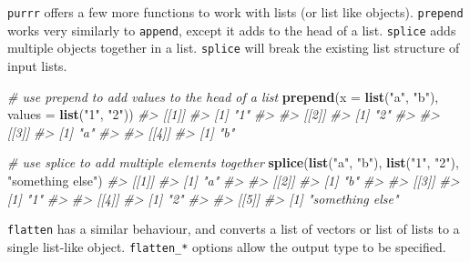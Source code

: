 \documentclass[]{book}
\newenvironment{Shaded}{}{}
\newcommand{\CommentTok}[1]{\textcolor[rgb]{0.38,0.63,0.69}{\textit{#1}}}
\newcommand{\DataTypeTok}[1]{\textcolor[rgb]{0.56,0.13,0.00}{#1}}
\newcommand{\DecValTok}[1]{\textcolor[rgb]{0.25,0.63,0.44}{#1}}
\newcommand{\KeywordTok}[1]{\textcolor[rgb]{0.00,0.44,0.13}{\textbf{#1}}}
\newcommand{\NormalTok}[1]{#1}
\newcommand{\StringTok}[1]{\textcolor[rgb]{0.25,0.44,0.63}{#1}}
\begin{document}
\texttt{purrr} offers a few more functions to work with lists (or list like objects). \texttt{prepend} works very similarly to \texttt{append}, except it adds to the head of a list. \texttt{splice} adds multiple objects together in a list. \texttt{splice} will break the existing list structure of input lists.

\begin{Shaded}
\begin{Highlighting}[]
\CommentTok{# use prepend to add values to the head of a list}
\KeywordTok{prepend}\NormalTok{(}\DataTypeTok{x =} \KeywordTok{list}\NormalTok{(}\StringTok{"a"}\NormalTok{, }\StringTok{"b"}\NormalTok{), }\DataTypeTok{values =} \KeywordTok{list}\NormalTok{(}\StringTok{"1"}\NormalTok{, }\StringTok{"2"}\NormalTok{))}
\CommentTok{#> [[1]]}
\CommentTok{#> [1] "1"}
\CommentTok{#> }
\CommentTok{#> [[2]]}
\CommentTok{#> [1] "2"}
\CommentTok{#> }
\CommentTok{#> [[3]]}
\CommentTok{#> [1] "a"}
\CommentTok{#> }
\CommentTok{#> [[4]]}
\CommentTok{#> [1] "b"}

\CommentTok{# use splice to add multiple elements together}
\KeywordTok{splice}\NormalTok{(}\KeywordTok{list}\NormalTok{(}\StringTok{"a"}\NormalTok{, }\StringTok{"b"}\NormalTok{), }\KeywordTok{list}\NormalTok{(}\StringTok{"1"}\NormalTok{, }\StringTok{"2"}\NormalTok{), }\StringTok{"something else"}\NormalTok{)}
\CommentTok{#> [[1]]}
\CommentTok{#> [1] "a"}
\CommentTok{#> }
\CommentTok{#> [[2]]}
\CommentTok{#> [1] "b"}
\CommentTok{#> }
\CommentTok{#> [[3]]}
\CommentTok{#> [1] "1"}
\CommentTok{#> }
\CommentTok{#> [[4]]}
\CommentTok{#> [1] "2"}
\CommentTok{#> }
\CommentTok{#> [[5]]}
\CommentTok{#> [1] "something else"}
\end{Highlighting}
\end{Shaded}

\texttt{flatten} has a similar behaviour, and converts a list of vectors or list of lists to a single list-like object. \texttt{flatten\_*} options allow the output type to be specified.

\begin{Shaded}
\end{Shaded}
\end{document}
